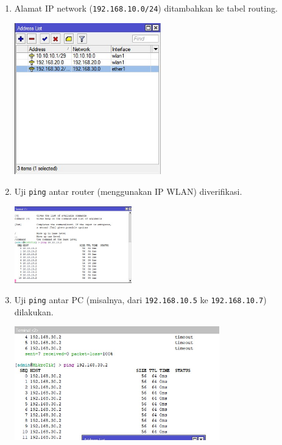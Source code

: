 \begin{enumerate}
    \item Alamat IP network (\texttt{192.168.10.0/24}) ditambahkan ke tabel routing.
    \begin{center}
        \includegraphics[width=0.5\textwidth]{img/address.jpg} %
    \end{center}
    \item Uji \texttt{ping} antar router (menggunakan IP WLAN) diverifikasi.
    \begin{center}
        \includegraphics[width=0.4\textwidth]{img/pingrslt3.jpg} %
    \end{center}
    \item Uji \texttt{ping} antar PC (misalnya, dari \texttt{192.168.10.5} ke \texttt{192.168.10.7}) dilakukan.
    \begin{center}
        \includegraphics[width=0.7\textwidth]{img/pingrslt2.jpg} %
    \end{center}
\end{enumerate}


